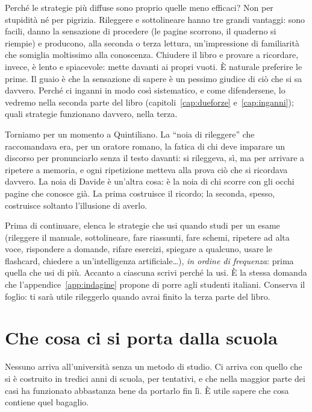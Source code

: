Perché le strategie più diffuse sono proprio quelle meno efficaci?
Non per stupidità né per pigrizia. Rileggere e sottolineare hanno tre
grandi vantaggi: sono facili, danno la sensazione di procedere (le
pagine scorrono, il quaderno si riempie) e producono, alla seconda o
terza lettura, un'impressione di familiarità che somiglia moltissimo
alla conoscenza. Chiudere il libro e provare a ricordare, invece, è
lento e spiacevole: mette davanti ai propri vuoti. È naturale preferire
le prime. Il guaio è che la sensazione di sapere è un pessimo giudice di
ciò che si sa davvero. Perché ci inganni in modo così sistematico, e
come difendersene, lo vedremo nella seconda parte del libro
(capitoli~\ref{cap:dueforze} e~\ref{cap:inganni}); quali strategie
funzionano davvero, nella terza.

Torniamo per un momento a Quintiliano. La \enquote{noia di rileggere}
che raccomandava era, per un oratore romano, la fatica di chi deve
imparare un discorso per pronunciarlo senza il testo davanti: si
rileggeva, sì, ma per arrivare a ripetere a memoria, e ogni ripetizione
metteva alla prova ciò che si ricordava davvero. La noia di Davide è un'altra cosa: è la noia di chi
scorre con gli occhi pagine che conosce già. La prima costruisce il
ricordo; la seconda, spesso, costruisce soltanto l'illusione di averlo.

\begin{esercizio}
Prima di continuare, elenca le strategie che usi quando studi per un
esame (rileggere il manuale, sottolineare, fare riassunti, fare schemi,
ripetere ad alta voce, rispondere a domande, rifare esercizi, spiegare a
qualcuno, usare le flashcard, chiedere a un'intelligenza artificiale\dots),
\emph{in ordine di frequenza}: prima quella che usi di più. Accanto a
ciascuna scrivi perché la usi. È la stessa domanda che
l'appendice~\ref{app:indagine} propone di porre agli studenti italiani.
Conserva il foglio: ti sarà utile rileggerlo quando avrai finito la
terza parte del libro.
\end{esercizio}

\section{Che cosa ci si porta dalla scuola}

Nessuno arriva all'università senza un metodo di studio. Ci arriva con
quello che si è costruito in tredici anni di scuola, per tentativi, e
che nella maggior parte dei casi ha funzionato abbastanza bene da
portarlo fin lì. È utile sapere che cosa contiene quel bagaglio.

